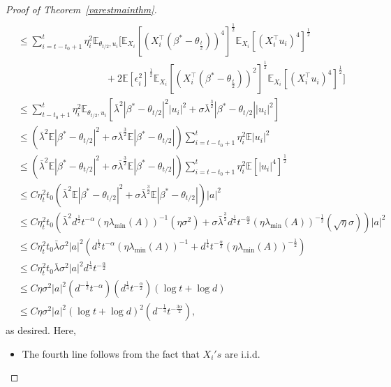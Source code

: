 \documentclass[11pt, reqno,english]{amsart}
\begin{document}
\begin{proof}[Proof of Theorem~\ref{varestmainthm}]
\begin{align*}
    \\
    &\leq \sum_{i = t-t_0 + 1}^t \eta^2_i \mathbb{E}_{\theta_{t/2}, u_i}\bigg[\mathbb{E}_{X_i}[(X^\top_i(\beta^* - \theta_{\frac{t}{2}}))^4]^{\frac{1}{2}}\mathbb{E}_{X_i}[(X^\top_i u_i)^4]^{\frac{1}{2}} 
    \\
    &\qquad \qquad \qquad \qquad \quad + 2\mathbb{E}[\epsilon^2_i]^{\frac{1}{2}}\mathbb{E}_{X_i}[(X^\top_i(\beta^* - \theta_{\frac{t}{2}}))^2]^{\frac{1}{2}}\mathbb{E}_{X_i}[(X^\top_iu_i)^4]^{\frac{1}{2}}\bigg]
    \\
    &\leq \sum_{t-t_0 + 1}^t \eta^2_{i}\mathbb{E}_{\theta_{t/2}, u_i}[\bar{\lambda}^2|\beta^* - \theta_{t/2}|^2|u_i|^2 + \sigma \bar{\lambda}^{\frac{3}{2}} |\beta^* - \theta_{t/2}||u_i|^2]
    \\
    &\leq (\bar{\lambda}^2\mathbb{E}|\beta^* - \theta_{t/2}|^2 + \sigma\bar{\lambda}^{\frac{3}{2}}\mathbb{E}|\beta^* - \theta_{t/2}|)\sum_{i = t-t_0 + 1}^t\eta^2_i\mathbb{E}|u_i|^2
    \\
    &\leq (\bar{\lambda}^2\mathbb{E}|\beta^* - \theta_{t/2}|^2 + \sigma\bar{\lambda}^{\frac{3}{2}}\mathbb{E}|\beta^* - \theta_{t/2}|)\sum_{i = t-t_0 + 1}^t\eta^2_i\mathbb{E}[|u_i|^4]^{\frac{1}{2}}
    \\
    &\leq C\eta^2_tt_0(\bar{\lambda}^2\mathbb{E}|\beta^* - \theta_{t/2}|^2 + \sigma\bar{\lambda}^{\frac{3}{2}}\mathbb{E}|\beta^* - \theta_{t/2}|)|a|^2
    \\
    &\leq C\eta^2_tt_0 (\bar{\lambda}^2d^{\frac{1}{2}}t^{-\alpha}(\eta \lambda_{\min}(A))^{-1} (\eta \sigma^2) + \sigma \bar{\lambda}^{\frac{3}{2}}d^{\frac{1}{4}}t^{-\frac{\alpha}{2}}(\eta \lambda_{\min}(A))^{-\frac{1}{2}}(\sqrt{\eta}\sigma))|a|^2
    \\
    &\leq C\eta^2_tt_0 \bar{\lambda}\sigma^2|a|^2(d^{\frac{1}{2}}t^{-\alpha}(\eta \lambda_{\min}(A))^{-1} + d^{\frac{1}{4}}t^{-\frac{\alpha}{2}}(\eta \lambda_{\min}(A))^{-\frac{1}{2}})
    \\
    &\leq C\eta^2_tt_0 \bar{\lambda}\sigma^2|a|^2 d^{\frac{1}{4}}t^{-\frac{\alpha}{2}}
    \\
    &\leq C\eta \sigma^2 |a|^2  (d^{-\frac{1}{2}}t^{-\alpha}) (d^{\frac{1}{4}}t^{-\frac{\alpha}{2}})(\log t + \log d)
    \\
    &\leq C\eta \sigma^2 |a|^2 (\log t + \log d)^2(d^{-\frac{1}{4}}t^{-\frac{3\alpha}{2}}),
\end{align*}
as desired. Here,
\begin{itemize}
    \item The fourth line follows from the fact that $X_i's$ are i.i.d.

\end{itemize}
\end{proof}
\end{document}
